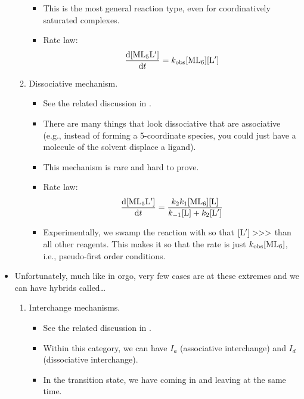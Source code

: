 \documentclass[../notes.tex]{subfiles}
\begin{document}
\begin{itemize}
\begin{enumerate}
\begin{itemize}
            \item This is the most general reaction type, even for coordinatively saturated complexes.
            \item Rate law:
            \begin{equation*}
                \dv{\ce{[ML5L$'$]}}{t} = k_\text{obs}\ce{[ML6][L$'$]}
            \end{equation*}
        \end{itemize}
        \item Dissociative mechanism.
        \begin{itemize}
            \item See the related discussion in \textcite{bib:CHEM20100Notes}.
            \item There are many things that look dissociative that are associative (e.g., instead of forming a 5-coordinate species, you could just have a molecule of the solvent displace a ligand).
            \item This mechanism is rare and hard to prove.
            \item Rate law:
            \begin{equation*}
                \dv{\ce{[ML5L$'$]}}{t} = \frac{k_2k_1\ce{[ML6][L]}}{k_{-1}\ce{[L]}+k_2\ce{[L$'$]}}
            \end{equation*}
            \item Experimentally, we swamp the reaction with  so that $\ce{[L$'$]}>>>$ than all other reagents. This makes it so that the rate is just $k_\text{obs}\ce{[ML6]}$, i.e., pseudo-first order conditions.
        \end{itemize}
    \end{enumerate}
    \item Unfortunately, much like in orgo, very few cases are at these extremes and we can have hybrids called\dots
    \begin{enumerate}[resume]
        \item Interchange mechanisms.
        \begin{itemize}
            \item See the related discussion in \textcite{bib:CHEM20100Notes}.
            \item Within this category, we can have $I_a$ (associative interchange) and $I_d$ (dissociative interchange).
            \item In the transition state, we have  coming in and  leaving at the same time.
        \end{itemize}

\end{enumerate}
\end{itemize}
\end{document}
